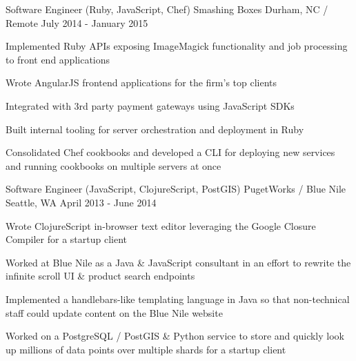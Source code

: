 \begin{cventries}
  \cventry
    {Software Engineer (Ruby, JavaScript, Chef)} %
    {Smashing Boxes} %
    {Durham, NC / Remote} %
    {July 2014 - January 2015} %
    {
      \begin{cvitems} %
        \item {Implemented Ruby APIs exposing ImageMagick functionality and job processing to front end applications}
        \item {Wrote AngularJS frontend applications for the firm's top clients}
        \item {Integrated with 3rd party payment gateways using JavaScript SDKs}
        \item {Built internal tooling for server orchestration and deployment in Ruby}
        \item {Consolidated Chef cookbooks and developed a CLI for deploying new services and running cookbooks on multiple servers at once}
      \end{cvitems}
    }


  \cventry
    {Software Engineer (JavaScript, ClojureScript, PostGIS)} %
    {PugetWorks / Blue Nile} %
    {Seattle, WA} %
    {April 2013 - June 2014} %
    {
      \begin{cvitems} %
        \item {Wrote ClojureScript in-browser text editor leveraging the Google Closure Compiler for a startup client}
        \item {Worked at Blue Nile as a Java \& JavaScript consultant in an effort to rewrite the infinite scroll UI \& product search endpoints}
        \item {Implemented a handlebars-like templating language in Java so that non-technical staff could update content on the Blue Nile website}
        \item {Worked on a PostgreSQL / PostGIS \& Python service to store and quickly look up millions of data points over multiple shards for a startup client}
      \end{cvitems}
    }


\end{cventries}
